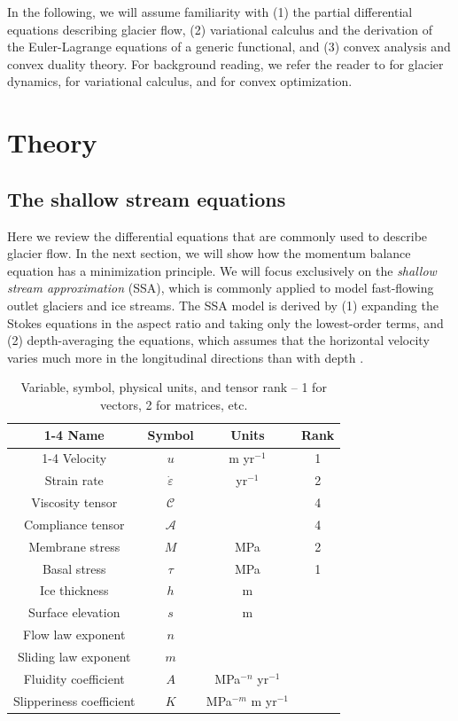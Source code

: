 \documentclass[review,oneside]{igs}
\begin{document}
In the following, we will assume familiarity with (1) the partial differential equations describing glacier flow, (2) variational calculus and the derivation of the Euler-Lagrange equations of a generic functional, and (3) convex analysis and convex duality theory.
For background reading, we refer the reader to \citet{greve2009dynamics} for glacier dynamics, \citet{weinstock1974calculus} for variational calculus, and \citet{boyd2004convex} for convex optimization.



\section{Theory}

\subsection{The shallow stream equations}

Here we review the differential equations that are commonly used to describe glacier flow.
In the next section, we will show how the momentum balance equation has a minimization principle.
We will focus exclusively on the \emph{shallow stream approximation} (SSA), which is commonly applied to model fast-flowing outlet glaciers and ice streams.
The SSA model is derived by (1) expanding the Stokes equations in the aspect ratio and taking only the lowest-order terms, and (2) depth-averaging the equations, which assumes that the horizontal velocity varies much more in the longitudinal directions than with depth \citep{greve2009dynamics}.

\begin{table}[h]
    \begin{tabular}{cccc}
        \cline{1-4}
        Name & Symbol & Units & Rank \\
        \cline{1-4}
        Velocity & $u$ & m yr${}^{-1}$ & 1 \\
        Strain rate & $\dot\varepsilon$ & yr${}^{-1}$ & 2 \\
        Viscosity tensor & $\mathscr{C}$ & & 4 \\
        Compliance tensor & $\mathscr{A}$ & & 4 \\
        Membrane stress & $M$ & MPa & 2 \\
        Basal stress & $\tau$ & MPa & 1 \\
        Ice thickness & $h$ & m &  \\
        Surface elevation & $s$ & m &  \\
        Flow law exponent & $n$ & &  \\
        Sliding law exponent & $m$ & &  \\
        Fluidity coefficient & $A$ & MPa${}^{-n}$ yr${}^{-1}$ &  \\
        Slipperiness coefficient & $K$ & MPa${}^{-m}$ m yr${}^{-1}$ &
    \end{tabular}
    \caption{Variable, symbol, physical units, and tensor rank -- 1 for vectors, 2 for matrices, etc.}
    \label{tab:symbols}
\end{table}
\end{document}
